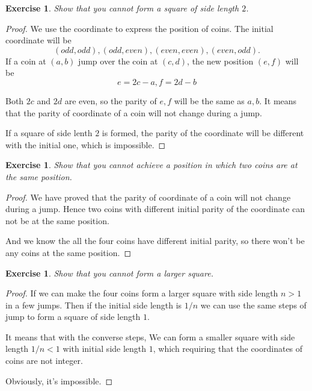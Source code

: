 \documentclass[12pt,a4]{article}
\theoremstyle{exercise}
\newtheorem{exercise}[theorem]{Exercise}
\begin{document}
\begin{exercise}
    Show that you cannot form a square of side length $2$.
\end{exercise}

\begin{proof}
     We use the coordinate to express the position of coins. The initial coordinate will be
    $$
    (odd, odd), (odd, even), (even, even), (even, odd).
    $$
    If a coin at $(a, b)$ jump over the coin at $(c, d)$, the new position $(e, f)$ will be
    $$
    e = 2c - a, f = 2d - b
    $$

  Both $2c$ and $2d$ are even, so the parity of $e, f$ will be the same as $a, b$. It means that the parity of coordinate of a coin will not change during a jump.

  If a square of side lenth $2$ is formed, the parity of the coordinate will be diﬀerent with the initial one, which is impossible.
\end{proof}

\begin{exercise}
    Show that you cannot achieve a position in which two coins are at the same position.
\end{exercise}

\begin{proof}
    We have proved that the parity of coordinate of a coin will not change during a jump. Hence two coins with different initial parity of the coordinate can not be at the same position. 
    
    And we know the all the four coins have different initial parity, so there won't be any coins at the same position.
\end{proof}

\begin{exercise}
    Show that you cannot form a larger square.
\end{exercise}

\begin{proof}
   If we can make the four coins form a larger square with side length $n > 1$ in a few jumps. Then if the initial side length is $1/n$ we can use the same steps of jump to form a square of side length $1$.
   
    It means that with the converse steps, We can form a smaller square with side length $1/n < 1$ with initial side length $1$, which requiring that the coordinates of coins are not integer.
    
     Obviously, it's impossible.
\end{proof}
\end{document}
